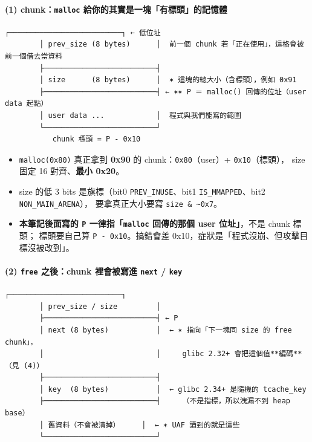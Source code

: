 \documentclass[10pt,a4paper]{article}
\providecommand{\tightlist}{%
  \setlength{\itemsep}{0pt}\setlength{\parskip}{0pt}}
\begin{document}
\paragraph{\texorpdfstring{(1) chunk：\texttt{malloc}
給你的其實是一塊「有標頭」的記憶體}{(1) chunk：malloc 給你的其實是一塊「有標頭」的記憶體}}\label{chunkmalloc-ux7d66ux4f60ux7684ux5176ux5be6ux662fux4e00ux584aux6709ux6a19ux982dux7684ux8a18ux61b6ux9ad4}

\begin{Verbatim}[breaklines=true,breakanywhere=true,breakautoindent=false,fontsize=\fontsize{7.0}{9.5}\selectfont]
        ┌──────────────────────────┐ ← 低位址
        │ prev_size (8 bytes)      │  前一個 chunk 若「正在使用」，這格會被前一個借去當資料
        ├──────────────────────────┤
        │ size      (8 bytes)      │  ✶ 這塊的總大小（含標頭），例如 0x91
        ├──────────────────────────┤ ← ✶✶ P ＝ malloc() 回傳的位址（user data 起點）
        │ user data ...            │  程式與我們能寫的範圍
        └──────────────────────────┘
           chunk 標頭 = P - 0x10
\end{Verbatim}

\begin{itemize}
\tightlist
\item
  \texttt{malloc(0x80)} 真正拿到 \textbf{0x90} 的
  chunk：\texttt{0x80}（user）+ \texttt{0x10}（標頭）， size 固定 16
  對齊、\textbf{最小 0x20}。
\item
  size 的低 3 bits 是旗標（bit0 \texttt{PREV\_\allowbreak{}INUSE}、bit1
  \texttt{IS\_\allowbreak{}MMAPPED}、bit2 \texttt{NON\_\allowbreak{}MAIN\_\allowbreak{}ARENA}），
  要拿真正大小要寫 \texttt{size\ \allowbreak{}\&\allowbreak{}\ \allowbreak{}\textasciitilde{}\allowbreak{}0x7}。
\item
  \textbf{本筆記後面寫的 \texttt{P} 一律指「\texttt{malloc} 回傳的那個
  user 位址」}，不是 chunk 標頭； 標頭要自己算
  \texttt{P\ \allowbreak{}-\allowbreak{}\ \allowbreak{}0x10}。搞錯會差
  0x10，症狀是「程式沒崩、但攻擊目標沒被改到」。
\end{itemize}

\paragraph{\texorpdfstring{(2) \texttt{free} 之後：chunk 裡會被寫進
\texttt{next} /
\texttt{key}}{(2) free 之後：chunk 裡會被寫進 next / key}}\label{free-ux4e4bux5f8cchunk-ux88e1ux6703ux88abux5bebux9032-next-key}

\begin{Verbatim}[breaklines=true,breakanywhere=true,breakautoindent=false,fontsize=\fontsize{7.0}{9.5}\selectfont]
        ┌──────────────────────────┐
        │ prev_size / size         │
        ├──────────────────────────┤ ← P
        │ next (8 bytes)           │  ← ✶ 指向「下一塊同 size 的 free chunk」，
        │                          │     glibc 2.32+ 會把這個值**編碼**（見 (4)）
        ├──────────────────────────┤
        │ key  (8 bytes)           │  ← glibc 2.34+ 是隨機的 tcache_key
        ├──────────────────────────┤     （不是指標，所以洩漏不到 heap base）
        │ 舊資料（不會被清掉）     │  ← ✶ UAF 讀到的就是這些
        └──────────────────────────┘
\end{Verbatim}
\end{document}
